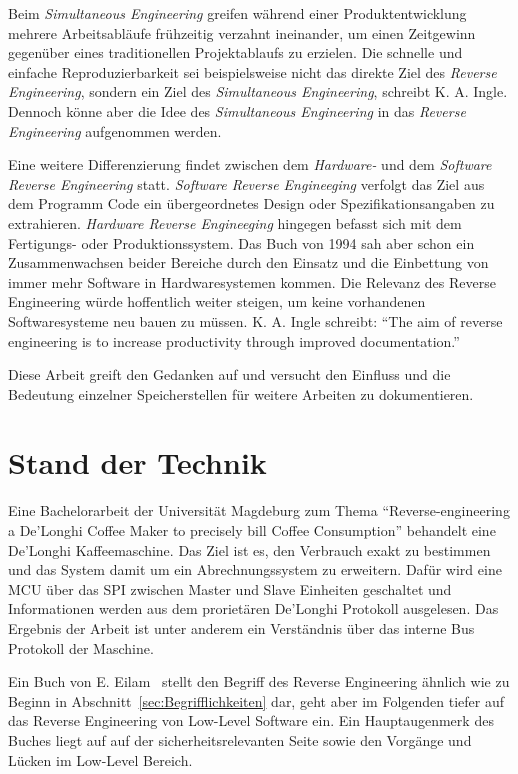 Beim \textit{Simultaneous Engineering} greifen während einer Produktentwicklung mehrere Arbeitsabläufe frühzeitig verzahnt ineinander, um einen Zeitgewinn gegenüber eines traditionellen Projektablaufs zu erzielen.
Die schnelle und einfache Reproduzierbarkeit sei beispielsweise nicht das direkte Ziel des \textit{Reverse Engineering}, sondern ein Ziel des \textit{Simultaneous Engineering}, schreibt K. A. Ingle.
Dennoch könne aber die Idee des \textit{Simultaneous Engineering} in das \textit{Reverse Engineering} aufgenommen werden.

Eine weitere Differenzierung findet zwischen dem \textit{Hardware-} und dem \textit{Software Reverse Engineering} statt.
\textit{Software Reverse Engineeging} verfolgt das Ziel aus dem Programm Code ein übergeordnetes Design oder Spezifikationsangaben zu extrahieren.
\textit{Hardware Reverse Engineeging} hingegen befasst sich mit dem Fertigungs- oder Produktionssystem.
Das Buch von 1994 sah aber schon ein Zusammenwachsen beider Bereiche durch den Einsatz und die Einbettung von immer mehr Software in Hardwaresystemen kommen.
Die Relevanz des Reverse Engineering würde hoffentlich weiter steigen, um keine vorhandenen Softwaresysteme neu bauen zu müssen.
K. A. Ingle schreibt: "`The aim of reverse engineering is to increase productivity through improved documentation."'\cite{Solr-153077417}

Diese Arbeit greift den Gedanken auf und versucht den Einfluss und die Bedeutung einzelner Speicherstellen für weitere Arbeiten zu dokumentieren.

\section{Stand der Technik}
Eine Bachelorarbeit der Universität Magdeburg zum Thema "`Reverse-engineering a De'Longhi Coffee Maker to precisely bill Coffee Consumption"'\cite{BachelorarbeitDeLonghi} behandelt eine De'Longhi Kaffeemaschine.
Das Ziel ist es, den Verbrauch exakt zu bestimmen und das System damit um ein Abrechnungssystem zu erweitern.
Dafür wird eine \ac{MCU} über das \ac{SPI} zwischen Master und Slave Einheiten geschaltet und Informationen werden aus dem prorietären De'Longhi Protokoll ausgelesen.
Das Ergebnis der Arbeit ist unter anderem ein Verständnis über das interne Bus Protokoll der Maschine.

Ein Buch von E. Eilam~\cite{Solr-480966761} stellt den Begriff des Reverse Engineering ähnlich wie zu Beginn in Abschnitt~\ref{sec:Begrifflichkeiten} dar, geht aber im Folgenden tiefer auf das Reverse Engineering von Low-Level Software ein.
Ein Hauptaugenmerk des Buches liegt auf auf der sicherheitsrelevanten Seite sowie den Vorgänge und Lücken im Low-Level Bereich.

